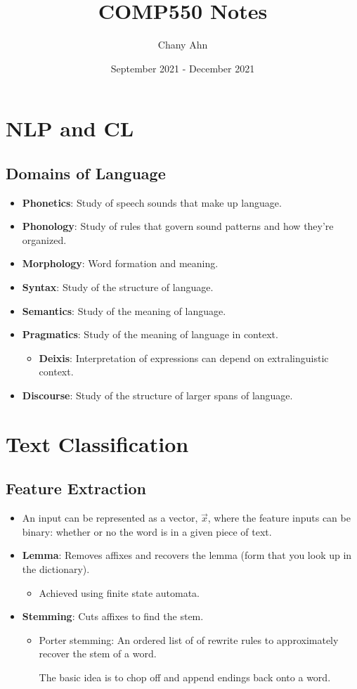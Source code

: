 \documentclass{article}
\title{COMP550 Notes}
\author{Chany Ahn}
\date{September 2021 - December 2021}
\begin{document}
\maketitle
\newpage
\tableofcontents
\newpage
\section{NLP and CL}
\subsection{Domains of Language}
\begin{itemize}
    \item \textbf{Phonetics}: Study of speech sounds that make up language.
    \item \textbf{Phonology}: Study of rules that govern sound patterns and how they're organized.
    \item \textbf{Morphology}: Word formation and meaning.
    \item \textbf{Syntax}: Study of the structure of language.
    \item \textbf{Semantics}: Study of the meaning of language.
    \item \textbf{Pragmatics}: Study of the meaning of language in context.
    \begin{itemize}
        \item \textbf{Deixis}: Interpretation of expressions can depend on extralinguistic context.
    \end{itemize}
    \item \textbf{Discourse}: Study of the structure of larger spans of language.
\end{itemize}

\section{Text Classification}
\subsection{Feature Extraction}
\begin{itemize}
    \item An input can be represented as a vector, $\vec{x}$, where the feature inputs can be binary: whether or no the word is in a given piece of text.
    \item \textbf{Lemma}: Removes affixes and recovers the lemma (form that you look up in the dictionary).
    \begin{itemize}
        \item Achieved using finite state automata.
    \end{itemize}
    \item \textbf{Stemming}: Cuts affixes to find the stem.
    \begin{itemize}
        \item Porter stemming: An ordered list of of rewrite rules to approximately recover the stem of a word.
        
        The basic idea is to chop off and append endings back onto a word.
    \end{itemize}
\end{itemize}
\end{document}
